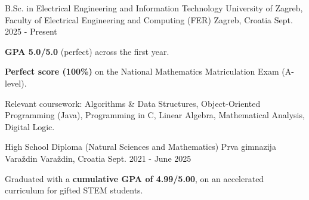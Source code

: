 
\begin{cventries}

  \cventry
    {B.Sc. in Electrical Engineering and Information Technology} %
    {University of Zagreb, Faculty of Electrical Engineering and Computing (FER)} %
    {Zagreb, Croatia} %
    {Sept. 2025 - Present} %
    {
      \begin{cvitems}
        \item {\textbf{GPA 5.0/5.0} (perfect) across the first year.}
        \item {\textbf{Perfect score (100\%)} on the National Mathematics Matriculation Exam (A-level).}
        \item {Relevant coursework: Algorithms \& Data Structures, Object-Oriented Programming (Java), Programming in C, Linear Algebra, Mathematical Analysis, Digital Logic.}
      \end{cvitems}
      \vspace{4mm}
    }

  \cventry
    {High School Diploma (Natural Sciences and Mathematics)} %
    {Prva gimnazija Varaždin} %
    {Varaždin, Croatia} %
    {Sept. 2021 - June 2025} %
    {
      \begin{cvitems}
        \item {Graduated with a \textbf{cumulative GPA of 4.99/5.00}, on an accelerated curriculum for gifted STEM students.}
      \end{cvitems}
    }

\end{cventries}
